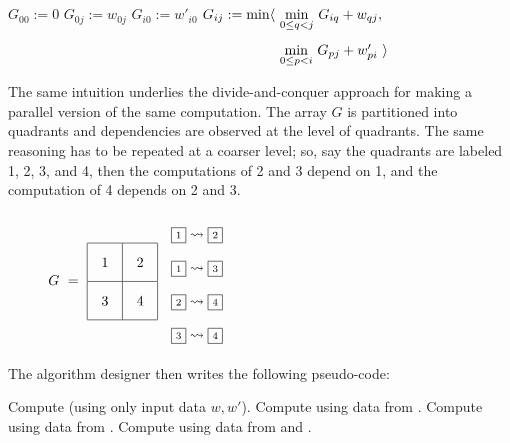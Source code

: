 \begin{algorithm}
\renewcommand\arraystretch{1.3}
\begin{algorithmic}
  \STATE $G_{00} := 0$
    $G_{0j} := w_{0j}$  
    \STATE $G_{i0} := w'_{i0}$
      \STATE $G_{ij} :=
        \begin{array}[t]{@{}l@{~}l} 
          \min\langle & \underset{0\leq q<j}\min ~ G_{iq} + w_{qj}, \\
                      & \underset{0\leq p<i}\min ~ G_{pj} + w'_{pi}~\rangle 
        \end{array}$
    \ENDFOR
  \ENDFOR
\end{algorithmic}
\end{algorithm}

The same intuition underlies the divide-and-conquer approach for making
a parallel version of the same computation. The array $G$ is partitioned into
quadrants and dependencies are observed at the level of quadrants. The same reasoning
has to be repeated at a coarser level;
so, say the quadrants are labeled 1, 2, 3, and 4, then the computations of 2 and 3 depend on 1,
and the computation of 4 depends on 2 and 3.

\newcommand\qbox[1]{\fbox{\scriptsize#1}}

\begin{figure}[b]
$\renewcommand\arraystretch{2}G ~=~
 \begin{array}{|@{\quad}c@{\quad}|@{\quad}c@{\quad}|} \hline 1 & 2 \\[1mm] \hline 3 & 4 \\[1mm] \hline\end{array}$
\qquad
$\begin{array}{l}\qbox1 \rightsquigarrow \qbox2 \\ 
\qbox1 \rightsquigarrow \qbox3 \\ \qbox2\rightsquigarrow \qbox4 \\ \qbox3 \rightsquigarrow \qbox4\end{array}$
\end{figure}

\medskip
The algorithm designer then writes the following pseudo-code:

\begin{algorithmic}[1]
  \STATE Compute \qbox1 (using only input data $w,w'$).
  \STATE Compute \qbox2 using data from \qbox1.
  \STATE Compute \qbox3 using data from \qbox1.
  \STATE Compute \qbox4 using data from \qbox2 and \qbox3.
\end{algorithmic}

